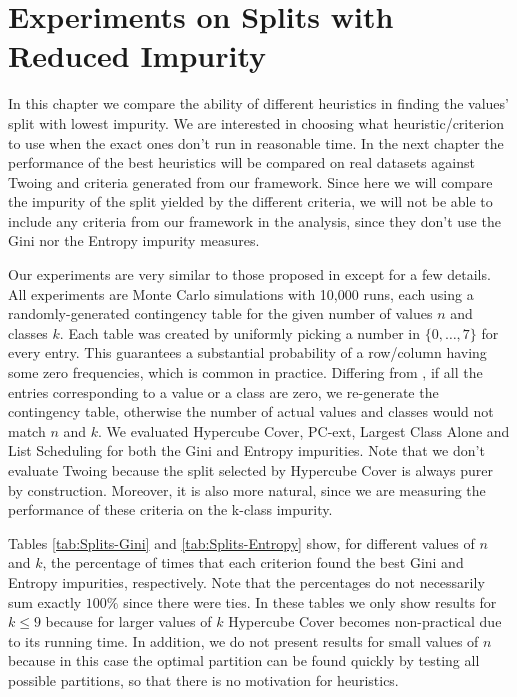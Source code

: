 \newpage

\chapter{Experiments on Splits with Reduced Impurity}
\label{chap:experiments-splits}

In this chapter we compare the ability of different heuristics in finding the values' split with lowest impurity. We are interested in choosing what heuristic/criterion to use when the exact ones don't run in reasonable time. In the next chapter the performance of the best heuristics will be compared on real datasets against Twoing and criteria generated from our framework. Since here we will compare the impurity of the split yielded by the different criteria, we will not be able to include any criteria from our framework in the analysis, since they don't use the Gini nor the Entropy impurity measures.

Our experiments are very similar to those proposed in \cite{journals/datamine/CoppersmithHH99} except for a few details. All experiments are Monte Carlo simulations with 10,000 runs, each using a randomly-generated contingency table for the given number of values $n$ and classes $k$. Each table  was created by uniformly picking a number in $\{0, \ldots, 7\}$ for every entry. This guarantees a substantial probability of a row/column having some zero frequencies, which is common in practice. Differing from  \cite{journals/datamine/CoppersmithHH99}, if all the entries corresponding to a value or a class are zero, we re-generate the contingency table, otherwise the number of actual values and classes would not match $n$ and $k$. We evaluated Hypercube Cover, PC-ext,
Largest Class Alone and List Scheduling for both the Gini and Entropy impurities. Note that we don't evaluate Twoing because the split selected by Hypercube Cover is always purer by construction. Moreover, it is also more natural, since we are measuring the performance of these criteria on the k-class impurity.

Tables \ref{tab:Splits-Gini} and \ref{tab:Splits-Entropy} show, for different values of $n$ and $k$, the percentage of times that
each criterion found the best Gini and Entropy impurities, respectively. Note that the percentages do not necessarily sum exactly $100\%$ since
there were ties. In these tables we only show results for $k \leq 9$ because for larger values
of $k$ Hypercube Cover becomes non-practical due to its running time. In addition, we do not present results for small values of $n$ because in this
case the optimal  partition can be found quickly by testing all possible partitions, so that there is no motivation for heuristics.


